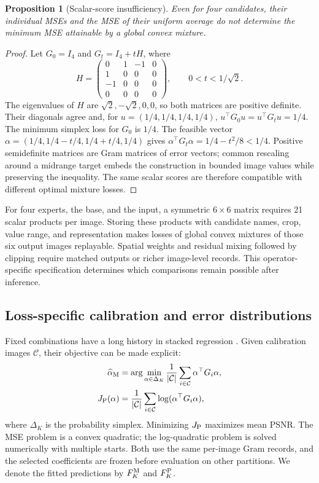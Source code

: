 \documentclass[12pt]{article}
\newtheorem{proposition}{Proposition}
\begin{document}
\begin{proposition}[Scalar-score insufficiency]
\label{prop:gram}
Even for four candidates, their individual MSEs and the MSE of their uniform average do not determine the minimum MSE attainable by a global convex mixture.
\end{proposition}
\begin{proof}
Let $G_0=I_4$ and $G_t=I_4+tH$, where
\begin{equation}
H=\begin{pmatrix}0&1&-1&0\\1&0&0&0\\-1&0&0&0\\0&0&0&0\end{pmatrix},
\qquad 0<t<1/\sqrt{2}.
\end{equation}
The eigenvalues of $H$ are $\sqrt{2},-\sqrt{2},0,0$, so both matrices are positive definite. Their diagonals agree and, for $u=(1/4,1/4,1/4,1/4)$, $u^\top G_0u=u^\top G_tu=1/4$. The minimum simplex loss for $G_0$ is $1/4$. The feasible vector $\alpha=(1/4,1/4-t/4,1/4+t/4,1/4)$ gives $\alpha^\top G_t\alpha=1/4-t^2/8<1/4$. Positive semidefinite matrices are Gram matrices of error vectors; common rescaling around a midrange target embeds the construction in bounded image values while preserving the inequality. The same scalar scores are therefore compatible with different optimal mixture losses.
\end{proof}

For four experts, the base, and the input, a symmetric $6\times6$ matrix requires 21 scalar products per image. Storing these products with candidate names, crop, value range, and representation makes losses of global convex mixtures of those six output images replayable. Spatial weights and residual mixing followed by clipping require matched outputs or richer image-level records. This operator-specific specification determines which comparisons remain possible after inference.

\subsection{Loss-specific calibration and error distributions}
Fixed combinations have a long history in stacked regression \citep{breiman1996stacked}. Given calibration images $\mathcal C$, their objective can be made explicit:
\begin{align}
\widehat\alpha_{\rm M}
&=\arg\min_{\alpha\in\Delta_K}\frac{1}{|\mathcal C|}\sum_{i\in\mathcal C}\alpha^\top G_i\alpha,\label{eq:calibration-mse}\\
J_{\rm P}(\alpha)
&=\frac{1}{|\mathcal C|}\sum_{i\in\mathcal C}\log(\alpha^\top G_i\alpha),\label{eq:calibration-psnr}
\end{align}
where $\Delta_K$ is the probability simplex. Minimizing $J_{\rm P}$ maximizes mean PSNR. The MSE problem is a convex quadratic; the log-quadratic problem is solved numerically with multiple starts. Both use the same per-image Gram records, and the selected coefficients are frozen before evaluation on other partitions. We denote the fitted predictions by $F_K^{\rm M}$ and $F_K^{\rm P}$.
\end{document}
